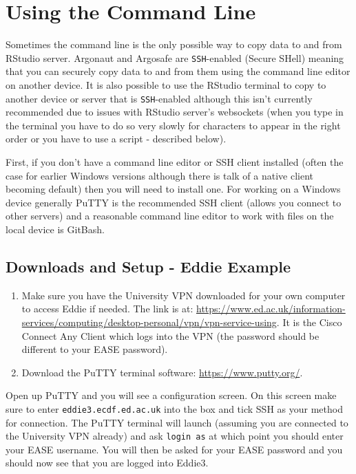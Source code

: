 \documentclass[]{book}
\providecommand{\tightlist}{%
  \setlength{\itemsep}{0pt}\setlength{\parskip}{0pt}}
\theoremstyle{definition}
\theoremstyle{definition}
\theoremstyle{definition}
\theoremstyle{remark}
\begin{document}
\hypertarget{using-the-command-line}{%
\section{Using the Command Line}\label{using-the-command-line}}

Sometimes the command line is the only possible way to copy data to and
from RStudio server. Argonaut and Argosafe are \texttt{SSH}-enabled
(Secure SHell) meaning that you can securely copy data to and from them
using the command line editor on another device. It is also possible to
use the RStudio terminal to copy to another device or server that is
\texttt{SSH}-enabled although this isn't currently recommended due to
issues with RStudio server's websockets (when you type in the terminal
you have to do so very slowly for characters to appear in the right
order or you have to use a script - described below).

First, if you don't have a command line editor or SSH client installed
(often the case for earlier Windows versions although there is talk of a
native client becoming default) then you will need to install one. For
working on a Windows device generally PuTTY is the recommended SSH
client (allows you connect to other servers) and a reasonable command
line editor to work with files on the local device is GitBash.

\hypertarget{downloads-and-setup---eddie-example}{%
\subsection{Downloads and Setup - Eddie
Example}\label{downloads-and-setup---eddie-example}}

\begin{enumerate}
\def\labelenumi{\arabic{enumi}.}
\tightlist
\item
  Make sure you have the University VPN downloaded for your own computer
  to access Eddie if needed. The link is at:
  \url{https://www.ed.ac.uk/information-services/computing/desktop-personal/vpn/vpn-service-using}.
  It is the Cisco Connect Any Client which logs into the VPN (the
  password should be different to your EASE password).\\
\item
  Download the PuTTY terminal software: \url{https://www.putty.org/}.
\end{enumerate}

Open up PuTTY and you will see a configuration screen. On this screen
make sure to enter \texttt{eddie3.ecdf.ed.ac.uk} into the box and tick
SSH as your method for connection. The PuTTY terminal will launch
(assuming you are connected to the University VPN already) and ask
\texttt{login\ as} at which point you should enter your EASE username.
You will then be asked for your EASE password and you should now see
that you are logged into Eddie3.
\end{document}
